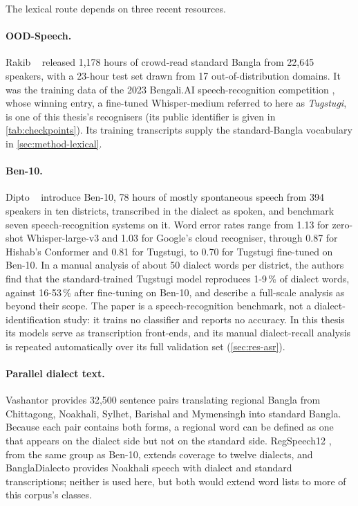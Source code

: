 The lexical route depends on three recent resources.

\paragraph{OOD-Speech.} Rakib \etal~\cite{Rakib2023OODSpeech} released 1,178 hours of
crowd-read standard Bangla from 22,645 speakers, with a 23-hour test set drawn
from 17 out-of-distribution domains. It was the training data of the 2023
Bengali.AI speech-recognition competition \cite{BengaliAI2023Speech},
whose winning entry, a fine-tuned Whisper-medium referred to here as
\emph{Tugstugi}, is one of this thesis's recognisers (its public identifier is
given in \cref{tab:checkpoints}). Its training transcripts
supply the standard-Bangla vocabulary in \cref{sec:method-lexical}.

\paragraph{Ben-10.} Dipto \etal~\cite{Dipto2025ASR} introduce Ben-10, 78 hours of mostly
spontaneous speech from 394 speakers in ten districts, transcribed in the
dialect as spoken, and benchmark seven speech-recognition systems on it. Word
error rates range from 1.13 for zero-shot Whisper-large-v3 and 1.03 for
Google's cloud recogniser, through 0.87 for Hishab's Conformer and 0.81 for
Tugstugi, to 0.70 for Tugstugi fine-tuned on Ben-10. In a manual analysis of
about 50 dialect words per district, the authors find that the
standard-trained Tugstugi model reproduces 1-9\,\% of dialect words, against
16-53\,\% after fine-tuning on Ben-10, and describe a full-scale analysis as beyond their scope.
The paper is a speech-recognition benchmark, not a dialect-identification
study: it trains no classifier and reports no accuracy. In this thesis its
models serve as transcription front-ends, and its manual dialect-recall
analysis is repeated automatically over its full validation set
(\cref{sec:res-asr}).

\paragraph{Parallel dialect text.} Vashantor \cite{Faria2023Vashantor}
provides 32,500 sentence pairs translating regional Bangla from Chittagong,
Noakhali, Sylhet, Barishal and Mymensingh into standard Bangla. Because each
pair contains both forms, a regional word can be defined as one that appears on
the dialect side but not on the standard side. RegSpeech12
\cite{Hassan2025RegSpeech12}, from the same group as Ben-10, extends coverage to
twelve dialects, and BanglaDialecto \cite{Samin2024BanglaDialecto} provides Noakhali
speech with dialect and standard transcriptions; neither is used here, but both
would extend word lists to more of this corpus's classes.

